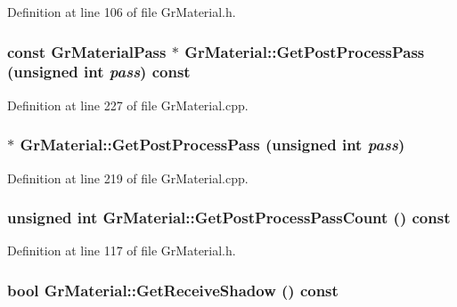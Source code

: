 \begin{CompactItemize}
Definition at line 106 of file GrMaterial.h.\hypertarget{class_gr_material_f0cd019c82baf63e7a837b400486e31e}{
\subsubsection[{GetPostProcessPass}]{\setlength{\rightskip}{0pt plus 5cm}const {\bf GrMaterialPass} $\ast$ GrMaterial::GetPostProcessPass (unsigned int {\em pass}) const}}
\label{class_gr_material_f0cd019c82baf63e7a837b400486e31e}




Definition at line 227 of file GrMaterial.cpp.\hypertarget{class_gr_material_41f016d8810c0dddd346de241ef18a4f}{
\subsubsection[{GetPostProcessPass}]{ $\ast$ GrMaterial::GetPostProcessPass (unsigned int {\em pass})}}
\label{class_gr_material_41f016d8810c0dddd346de241ef18a4f}




Definition at line 219 of file GrMaterial.cpp.\hypertarget{class_gr_material_ec2234608525b1f9b306990871cd984a}{
\subsubsection[{GetPostProcessPassCount}]{\setlength{\rightskip}{0pt plus 5cm}unsigned int GrMaterial::GetPostProcessPassCount () const}}
\label{class_gr_material_ec2234608525b1f9b306990871cd984a}




Definition at line 117 of file GrMaterial.h.\hypertarget{class_gr_material_eb0504c0f3e86635d4a0b56745beab79}{
\subsubsection[{GetReceiveShadow}]{\setlength{\rightskip}{0pt plus 5cm}bool GrMaterial::GetReceiveShadow () const}}
\label{class_gr_material_eb0504c0f3e86635d4a0b56745beab79}





\end{CompactItemize}
